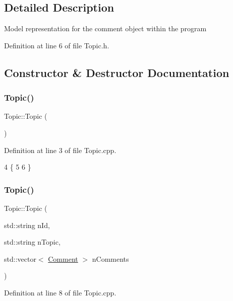 \subsection{Detailed Description}
Model representation for the comment object within the program 

Definition at line 6 of file Topic.\+h.



\subsection{Constructor \& Destructor Documentation}
\mbox{\label{class_topic_af3301cb0d535eb066a3ea4ed54e28414}} 
\subsubsection{\texorpdfstring{Topic()}{Topic()}\hspace{0.1cm}{\footnotesize\ttfamily [1/2]}}
{\footnotesize\ttfamily Topic\+::\+Topic (\begin{DoxyParamCaption}{ }\end{DoxyParamCaption})}



Definition at line 3 of file Topic.\+cpp.


\begin{DoxyCode}
4 \{
5 
6 \}
\end{DoxyCode}
\mbox{\label{class_topic_a1f896499cd9eddcf5138830364860534}} 
\subsubsection{\texorpdfstring{Topic()}{Topic()}\hspace{0.1cm}{\footnotesize\ttfamily [2/2]}}
{\footnotesize\ttfamily Topic\+::\+Topic (\begin{DoxyParamCaption}\item[{std\+::string}]{n\+Id,  }\item[{std\+::string}]{n\+Topic,  }\item[{std\+::vector$<$ \hyperlink{class_comment}{Comment} $>$}]{n\+Comments }\end{DoxyParamCaption})}



Definition at line 8 of file Topic.\+cpp.



